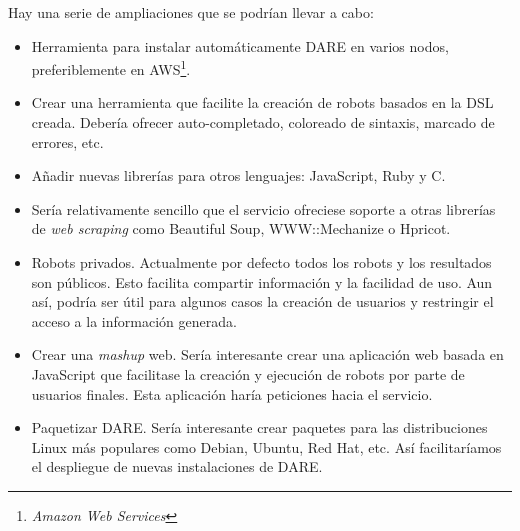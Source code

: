 Hay una serie de ampliaciones que se podrían llevar a cabo:

\begin{itemize}
  \item Herramienta para instalar automáticamente DARE en varios
    nodos, preferiblemente en AWS\footnote{\emph{Amazon Web Services}}.
  \item Crear una herramienta que facilite la creación de robots
    basados en la DSL creada. Debería ofrecer auto-completado,
    coloreado de sintaxis, marcado de errores, etc.
  \item Añadir nuevas librerías para otros lenguajes: JavaScript, Ruby
    y C.
  \item Sería relativamente sencillo que el servicio ofreciese soporte
    a otras librerías de \emph{web scraping} como Beautiful
    Soup\cite{SOUP}, WWW::Mechanize\cite{MECHANIZE} o
    Hpricot\cite{HPRICOT}.
  \item Robots privados. Actualmente por defecto todos los robots y
    los resultados son públicos. Esto facilita compartir información y
    la facilidad de uso. Aun así, podría ser útil para algunos casos
    la creación de usuarios y restringir el acceso a la información
    generada.
  \item \label{MASHUP_REF} Crear una \emph{mashup}\cite{MASHUP} web. Sería
    interesante crear una aplicación web basada en JavaScript que
    facilitase la creación y ejecución de robots por parte de usuarios
    finales. Esta aplicación haría peticiones hacia el servicio.
  \item Paquetizar DARE. Sería interesante crear paquetes para las
    distribuciones Linux más populares como Debian, Ubuntu, Red Hat,
    etc. Así facilitaríamos el despliegue de nuevas instalaciones de
    DARE.
\end{itemize}
